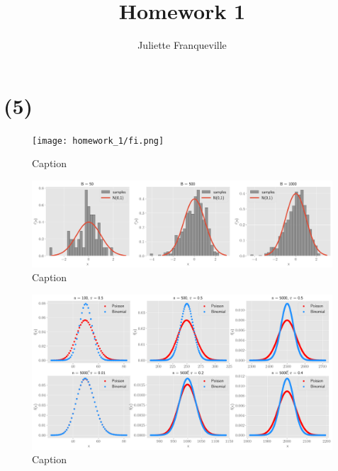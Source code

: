 \documentclass[10pt]{article}
\begin{document}
 
\title{Homework 1}
\author{Juliette Franqueville\\
}
\maketitle
 
\section*{(5)}

\begin{figure}[!h]
    \centering
    \texttt{[image: homework\_1/fi.png]}
    \caption{Caption}
    \label{fig:my_label}
\end{figure}

\begin{figure}[!h]
    \centering
    \includegraphics[scale=.35]{homework_1/../second_hist.png}
    \caption{Caption}
    \label{fig:my_label}
\end{figure}


\begin{figure}[!h]
    \centering
    \includegraphics[scale=.35]{homework_1/third_hist.png}
    \caption{Caption}
    \label{fig:my_label}
\end{figure}
\end{document}

